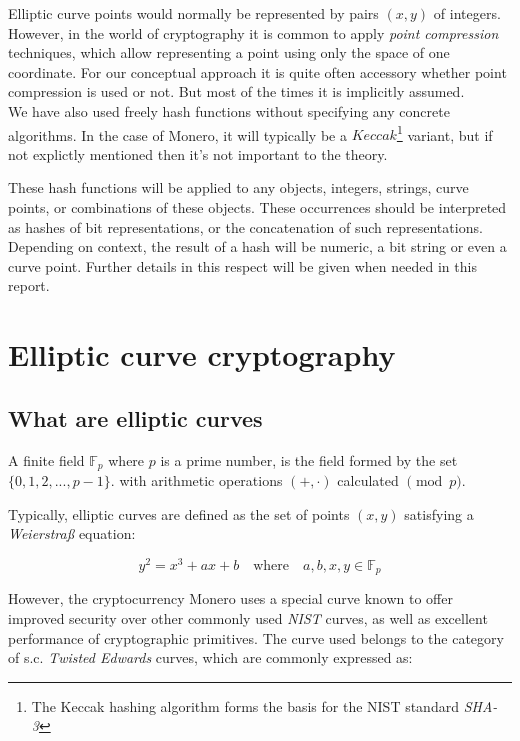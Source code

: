 Elliptic curve points would normally be represented by pairs \((x, y)\) of integers.
However, in the world of cryptography it is common to apply {\em point compression} techniques,
which allow representing a point using only the space of one coordinate.
For our conceptual approach it is quite often accessory whether point compression is used or not.
But most of the times it is implicitly assumed. 
\\

We have also used freely hash functions without specifying any concrete algorithms.
In the case of Monero,  it will typically be a \(\mathit{Keccak}\)\footnote{The Keccak hashing algorithm forms the basis
for the NIST standard {\em SHA-3}} 
variant, but if not explictly mentioned then it's not important to the theory.

These hash functions will be applied to any objects, integers, strings, curve points, or combinations of
these objects. 
These occurrences should be interpreted as hashes of bit representations, or the concatenation of such
representations.
Depending on context, the result of a hash will be numeric, a bit string or even a curve point.
Further details in this respect will be given when needed in this report. 




\section{Elliptic curve cryptography}
\label{EllipticCurveCryptography}

\subsection{What are elliptic curves}


A finite field \(\mathbb{F}_p\) where \(p\) is a prime number, is the field formed by the set \(\{0, 1, 2, ..., p-1\}\). with arithmetic operations \((+,  \cdot)\) calculated \( \pmod p\).


Typically, elliptic curves are defined as the set of points \((x, y)\) satisfying a {\em Weierstraß} equation:
 
\[y^2 = x^3 + a x + b \quad \textrm{where} \quad a, b, x, y \in \mathbb{F}_p \]

However, the cryptocurrency Monero uses a special curve known to offer improved security over other commonly used {\em NIST} curves, as well as excellent performance of cryptographic primitives. The curve used belongs to the category of s.c. {\em Twisted Edwards} curves, which are commonly expressed as: 

